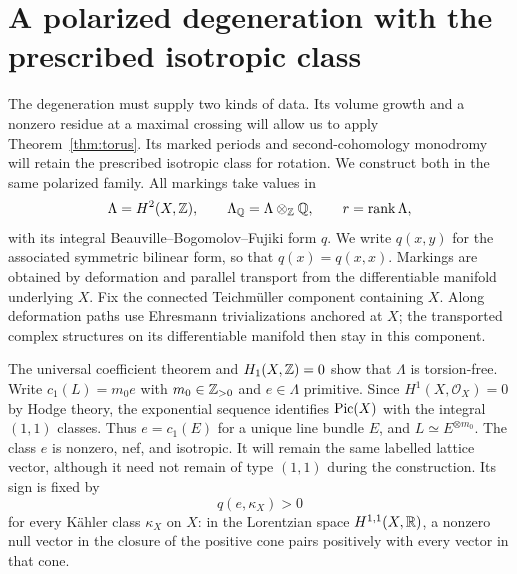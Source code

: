 \section{A polarized degeneration with the prescribed isotropic class}
\label{sec:family}

The degeneration must supply two kinds of data. Its volume growth and
a nonzero residue at a maximal crossing will allow us to apply
Theorem~\ref{thm:torus}. Its marked periods and second-cohomology
monodromy will retain the prescribed isotropic class for rotation.
We construct both in the same polarized family.
All markings take values in
\[
 \Lambda=H^2(X,\mathbb Z),\qquad \Lambda_{\mathbb Q}=\Lambda\otimes_{\mathbb Z}\mathbb Q,
 \qquad r=\operatorname{rank}\Lambda,
\]
with its integral Beauville--Bogomolov--Fujiki form $q$.  We write
$q(x,y)$ for the associated symmetric bilinear form, so that
$q(x)=q(x,x)$.  Markings are obtained by deformation and parallel
transport from the differentiable manifold underlying $X$.
Fix the connected Teichm\"uller component containing $X$. Along
deformation paths use Ehresmann trivializations anchored at $X$;
the transported complex structures on its differentiable manifold
then stay in this component.

The universal coefficient theorem and $H_1(X,\mathbb Z)=0$ show that
$\Lambda$ is torsion-free.  Write $c_1(L)=m_0e$ with
$m_0\in\mathbb Z_{>0}$ and $e\in\Lambda$ primitive.  Since
$H^1(X,\mathcal O_X)=0$ by Hodge theory, the
exponential sequence identifies $\operatorname{Pic}(X)$ with the integral
$(1,1)$ classes.  Thus $e=c_1(E)$ for a unique line bundle $E$,
and $L\simeq E^{\otimes m_0}$.  The class $e$ is nonzero, nef,
and isotropic.  It will remain the same labelled lattice vector,
although it need not remain of type $(1,1)$ during the construction.
Its sign is fixed by
\[
                    q(e,\kappa_X)>0
\]
for every Kähler class $\kappa_X$ on $X$: in the Lorentzian space
$H^{1,1}(X,\mathbb R)$, a nonzero null vector in the closure of the positive
cone pairs positively with every vector in that cone.


